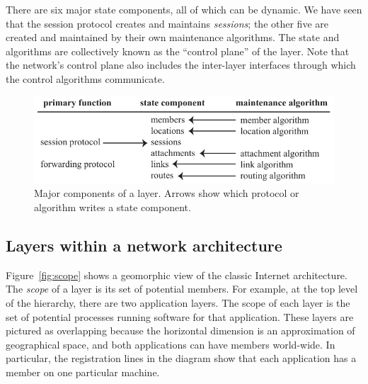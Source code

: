 There are six major state components, all of which 
can be dynamic.
We have seen that the session protocol creates and maintains
{\it sessions};
the other five are created and maintained by their own maintenance
algorithms.
The state and algorithms are collectively known as the ``control plane''
of the layer.
Note that the network's control plane also includes the inter-layer
interfaces through which the control algorithms communicate.

\begin{figure}
\centering
\includegraphics[scale=1.00]{figures/table.pdf}
\caption{Major components of a layer.  Arrows show which protocol
or algorithm writes a state component.}
\label{fig:table}
\end{figure}

\subsection{Layers within a network architecture}

Figure~\ref{fig:scope} shows a geomorphic view of the classic
Internet architecture.
The {\it scope} of a layer is its set of potential members.
For example, 
at the top level of the hierarchy, there are two application layers.
The scope of each layer is the set of potential processes running
software for that application.
These layers are pictured as overlapping because the horizontal
dimension is an approximation of geographical space, and both
applications can have members world-wide.
In particular, the registration lines in the diagram show that each
application has a member on one particular machine.

